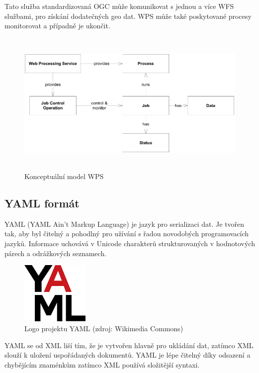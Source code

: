 \documentclass[a4paper,oneside,12pt]{book}
\begin{document}
\hspace{10mm}Tato služba standardizovaná OGC může komunikovat s jednou a více WFS službami, pro získání dodatečných geo dat. \cite{Stollberg2007} WPS může také poskytované procesy monitorovat a případně je ukončit. \cite{5Xjhvf3W3tsG6nhX} 

\begin{figure}[ht] \label{obr6}
\centering
\includegraphics[height=7cm]{pictures/WPS.png}
\caption{Konceptuální model WPS \cite{5Xjhvf3W3tsG6nhX}}
\label{fig:wps}
\end{figure}


\subsection{YAML formát} \label{yaml}



\hspace{10mm}YAML (YAML Ain’t Markup Language) je jazyk pro serializaci dat. Je tvořen tak, aby byl čitelný a pohodlný pro užívání s řadou novodobých programovacích jazyků. Informace uchovává v Unicode charakterů strukturovaných v hodnotových párech a  odrážkových seznamech.  \cite{hsOq0virmVAO85Ud}
\begin{figure}[ht] \label{obr7}
\centering
\includegraphics[height=3cm]{pictures/yaml.png}
\caption{Logo projektu YAML  (zdroj: Wikimedia Commons)}
\label{fig:yaml}
\end{figure}

\hspace{10mm}YAML se od XML liší tím, že je vytvořen hlavně pro ukládání dat, zatímco XML slouží k uložení uspořádaných dokumentů. YAML je lépe čitelný díky odsazení a chybějícím znaménkům zatímco XML používá složitější syntaxi. \cite{hsOq0virmVAO85Ud}
\end{document}
